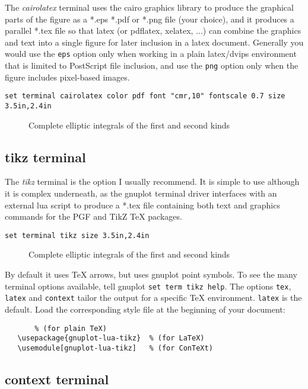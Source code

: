 \documentclass[letterpaper,11pt]{article}
\newcommand{\gpinsetfigure}[2]{
  \begin{figure}[H]
  \centering
  
  \caption{#2}
  \end{figure}
}
\begin{document}
The {\em cairolatex} terminal uses the cairo graphics library to produce
the graphical parts of the figure as a *.eps *.pdf or *.png file (your choice),
and it produces a parallel *.tex file so that latex (or pdflatex, xelatex, ...)
can combine the graphics and text into a single figure for later inclusion in a
latex document.  Generally you would use the {\tt eps} option only when working
in a plain latex/dvips environment that is limited to PostScript file inclusion,
and use the {\tt png} option only when the figure includes pixel-based images.

\begin{verbatim}
set terminal cairolatex color pdf font "cmr,10" fontscale 0.7 size 3.5in,2.4in
\end{verbatim}
\gpinsetfigure{latex_cairo}
              {Complete elliptic integrals of the first and second kinds}


\subsection*{tikz terminal}

The {\em tikz} terminal is the option I usually recommend.
It is simple to use although it is complex underneath, as the gnuplot
terminal driver interfaces with an external lua script to produce a *.tex file
containing both text and graphics commands for the PGF and TikZ {\TeX} packages.

\begin{verbatim}
set terminal tikz size 3.5in,2.4in
\end{verbatim}
\gpinsetfigure{latex_tikz}
              {Complete elliptic integrals of the first and second kinds}

By default it uses {\TeX} arrows, but uses gnuplot point symbols.
To see the many terminal options available, tell gnuplot {\tt set term tikz help}.
The options {\tt tex}, {\tt latex} and {\tt context} tailor the output for
a specific {\TeX} environment.  {\tt latex} is the default.
Load the corresponding style file at the beginning of your document:
\begin{verbatim}
       % (for plain TeX)
   \usepackage{gnuplot-lua-tikz}  % (for LaTeX)
   \usemodule[gnuplot-lua-tikz]   % (for ConTeXt)
\end{verbatim}

\subsection*{context terminal}
\end{document}
